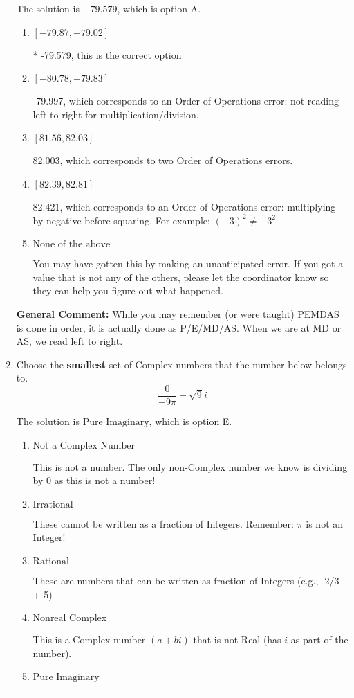 \documentclass{extbook}[14pt]
\newcommand{\litem}[1]{\item #1

\rule{\textwidth}{0.4pt}}
\begin{document}
\begin{enumerate}
{The solution is \( -79.579 \), which is option A.\begin{enumerate}[label=\Alph*.]
\item \( [-79.87, -79.02] \)

* -79.579, this is the correct option
\item \( [-80.78, -79.83] \)

 -79.997, which corresponds to an Order of Operations error: not reading left-to-right for multiplication/division.
\item \( [81.56, 82.03] \)

 82.003, which corresponds to two Order of Operations errors.
\item \( [82.39, 82.81] \)

 82.421, which corresponds to an Order of Operations error: multiplying by negative before squaring. For example: $(-3)^2 \neq -3^2$
\item \( \text{None of the above} \)

 You may have gotten this by making an unanticipated error. If you got a value that is not any of the others, please let the coordinator know so they can help you figure out what happened.
\end{enumerate}

\textbf{General Comment:} While you may remember (or were taught) PEMDAS is done in order, it is actually done as P/E/MD/AS. When we are at MD or AS, we read left to right.
}
\litem{
Choose the \textbf{smallest} set of Complex numbers that the number below belongs to.
\[ \frac{0}{-9 \pi}+\sqrt{9}i \]

The solution is \( \text{Pure Imaginary} \), which is option E.\begin{enumerate}[label=\Alph*.]
\item \( \text{Not a Complex Number} \)

This is not a number. The only non-Complex number we know is dividing by 0 as this is not a number!
\item \( \text{Irrational} \)

These cannot be written as a fraction of Integers. Remember: $\pi$ is not an Integer!
\item \( \text{Rational} \)

These are numbers that can be written as fraction of Integers (e.g., -2/3 + 5)
\item \( \text{Nonreal Complex} \)

This is a Complex number $(a+bi)$ that is not Real (has $i$ as part of the number).
\item \( \text{Pure Imaginary} \)


\end{enumerate}}
\end{enumerate}
\end{document}

